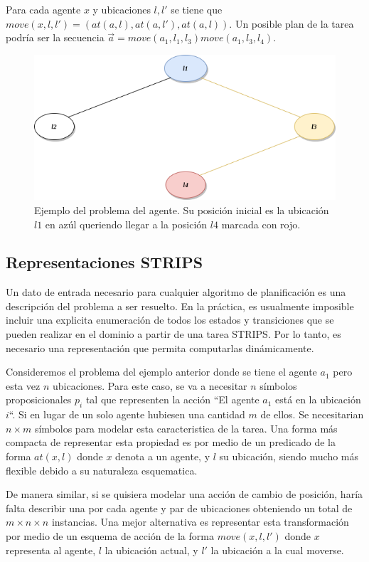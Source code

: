 Para cada agente $x$ y ubicaciones $l, l'$ se tiene que $move(x, l, l') =
({at(a, l)}, {at(a, l')}, {at(a, l)})$. Un posible plan de la tarea podría ser
la secuencia $\vec{a} = move(a_1, l_1, l_3)move(a_1, l_3, l_4)$.

\begin{figure}
    \centering
    \includegraphics[scale=0.5]{figures/agent_example.png}
    \caption{Ejemplo del problema del agente. Su posición inicial es la ubicación
             $l1$ en azúl queriendo llegar a la posición $l4$ marcada con rojo.}
\end{figure}


\subsection{Representaciones STRIPS}

Un dato de entrada necesario para cualquier algoritmo de planificación es una
descripción del problema a ser resuelto. En la práctica, es usualmente imposible
incluir una explicita enumeración de todos los estados y transiciones que se
pueden realizar en el dominio a partir de una tarea STRIPS. Por lo tanto, es
necesario una representación que permita computarlas dinámicamente.

Consideremos el problema del ejemplo anterior donde se tiene el agente $a_1$
pero esta vez $n$ ubicaciones. Para este caso, se va a necesitar $n$ símbolos
proposicionales $p_i$ tal que representen la acción ``El agente $a_1$ está en la
ubicación $i$``. Si en lugar de un solo agente hubiesen una cantidad $m$ de
ellos. Se necesitarian $n \times m$ símbolos para modelar esta caracteristica de
la tarea. Una forma más compacta de representar esta propiedad es por medio de
un predicado de la forma $at(x, l)$ donde $x$ denota a un agente, y $l$ su
ubicación, siendo mucho más flexible debido a su naturaleza esquematica.

De manera similar, si se quisiera modelar una acción de cambio de posición,
haría falta describir una por cada agente y par de ubicaciones obteniendo un
total de $m \times n \times n$ instancias. Una mejor alternativa es representar
esta transformación por medio de un esquema de acción de la forma $move(x, l,
l')$ donde $x$ representa al agente, $l$ la ubicación actual, y $l'$ la ubicación
a la cual moverse.

